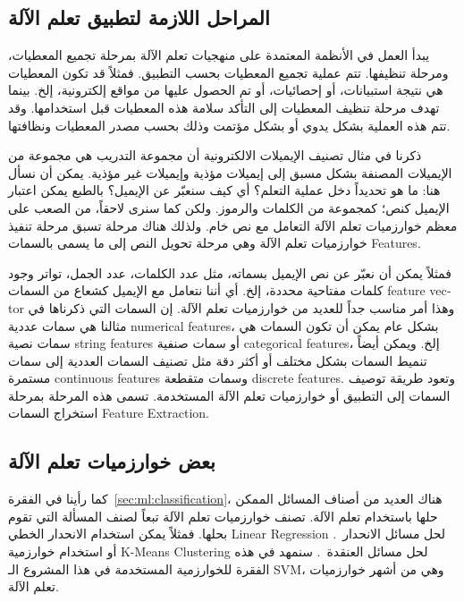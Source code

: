 \subsection{المراحل اللازمة لتطبيق تعلم الآلة}
\label{sec:ml:steps}

يبدأ العمل في الأنظمة المعتمدة على منهجيات تعلم الآلة بمرحلة تجميع المعطيات، ومرحلة تنظيفها. تتم عملية تجميع المعطيات بحسب التطبيق.
فمثلاً قد تكون المعطيات هي نتيجة استبيانات، أو إحصائيات، أو تم الحصول عليها من مواقع إلكترونية، إلخ.
بينما تهدف مرحلة تنظيف المعطيات إلى التأكد سلامة هذه المعطيات قبل استخدامها.
وقد تتم هذه العملية بشكل يدوي أو بشكل مؤتمت وذلك بحسب مصدر المعطيات ونظافتها.

ذكرنا في مثال تصنيف الإيميلات الالكترونية أن مجموعة التدريب هي مجموعة من الإيميلات المصنفة بشكل مسبق إلى إيميلات مؤذية وإيميلات غير مؤذية.
يمكن أن نسأل هنا: ما هو تحديداً دخل عملية التعلم؟ أي كيف سنعبّر عن الإيميل؟ بالطبع يمكن اعتبار الإيميل كنص؛ كمجموعة من الكلمات والرموز.
ولكن كما سنرى لاحقاً، من الصعب على معظم خوارزميات تعلم الآلة التعامل مع نص خام. ولذلك هناك مرحلة تسبق مرحلة تنفيذ خوارزميات تعلم الآلة
وهي مرحلة تحويل النص إلى ما يسمى بالسمات \textenglish{Features}.

فمثلاً يمكن أن نعبّر عن نص الإيميل بسماته، مثل عدد الكلمات، عدد الجمل،
تواتر وجود كلمات مفتاحية محددة، إلخ. أي أننا نتعامل مع الإيميل كشعاع من السمات \textenglish{feature vector} وهذا أمر مناسب جداً
للعديد من خوارزميات تعلم الآلة. إن السمات التي ذكرناها في مثالنا هي سمات عددية \textenglish{numerical features}، بشكل عام يمكن أن تكون السمات
هي سمات نصية \textenglish{string features} أو سمات صنفية \textenglish{categorical features}، إلخ. 
ويمكن أيضاً تنميط السمات بشكل مختلف أو أكثر دقة
مثل تصنيف السمات العددية إلى سمات مستمرة \textenglish{continuous features} وسمات متقطعة \textenglish{discrete features}. 
وتعود طريقة توصيف السمات إلى
التطبيق أو خوارزميات تعلم الآلة المستخدمة. تسمى هذه المرحلة بمرحلة استخراج السمات \textenglish{Feature Extraction}.





\subsection{بعض خوارزميات تعلم الآلة}
\label{sec:ml:algs}
كما رأينا في الفقرة~\ref{sec:ml:classification}، هناك العديد من أصناف المسائل الممكن حلها باستخدام تعلم الآلة.
تصنف خوارزميات تعلم الآلة تبعاً لصنف المسألة التي تقوم بحلها. فمثلاً يمكن استخدام الانحدار الخطي
\textenglish{Linear Regression}
لحل مسائل الانحدار~\cite{hands-on}.
أو استخدام خوارزمية \textenglish{K-Means Clustering}  لحل مسائل العنقدة~\cite{hands-on}.
سنمهد في هذه الفقرة للخوارزمية المستخدمة في هذا المشروع الـ \textenglish{SVM}،
وهي من أشهر خوارزميات تعلم الآلة.


